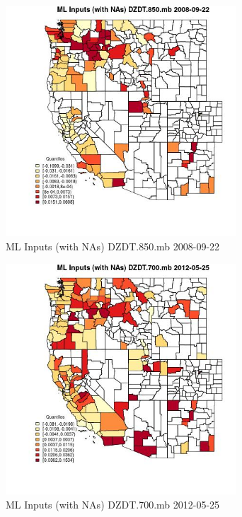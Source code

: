 \begin{figure} 
\centering  
\includegraphics[width=0.77\textwidth]{Code_Outputs/Report_ML_input_PM25_Step4_part_e_de_duplicated_aves_compiled_2019-05-18wNAs_CountyDZDT850mbMean2008-09-22_2008-09-22.jpg} 
\caption{\label{fig:Report_ML_input_PM25_Step4_part_e_de_duplicated_aves_compiled_2019-05-18wNAsCountyDZDT850mbMean2008-09-22_2008-09-22}ML Inputs (with NAs) DZDT.850.mb 2008-09-22} 
\end{figure} 
 

\begin{figure} 
\centering  
\includegraphics[width=0.77\textwidth]{Code_Outputs/Report_ML_input_PM25_Step4_part_e_de_duplicated_aves_compiled_2019-05-18wNAs_CountyDZDT700mbMean2012-05-25_2012-05-25.jpg} 
\caption{\label{fig:Report_ML_input_PM25_Step4_part_e_de_duplicated_aves_compiled_2019-05-18wNAsCountyDZDT700mbMean2012-05-25_2012-05-25}ML Inputs (with NAs) DZDT.700.mb 2012-05-25} 
\end{figure} 
 

